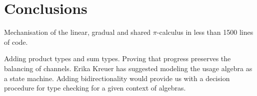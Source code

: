 \documentclass[a4paper,UKenglish,cleveref,autoref,thm-restate,authorcolumns]{lipics-v2019}
\theoremstyle{definition}
\newcommand{\picalc}{$\pi$-calculus}
\begin{document}
\cite{Rouvoet2020}

\section{Conclusions}

Mechanisation of the linear, gradual and shared \picalc{} in less than 1500 lines of code.

Adding product types and sum types.
Proving that progress preserves the balancing of channels.
Erika Kreuer has suggested modeling the usage algebra as a state machine.
Adding bidirectionality would provide us with a decision procedure for type checking for a given context of algebras.

\newpage


\newpage
\appendix

\end{document}
